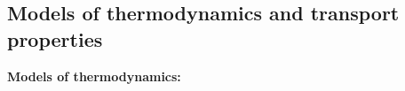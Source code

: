 \subsection{Models of thermodynamics and transport properties} \label{thermo models}
\textbf{Models of thermodynamics:}

